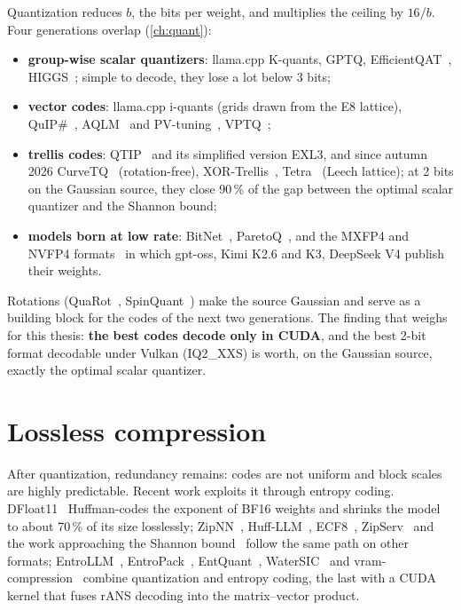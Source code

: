 Quantization reduces $b$, the bits per weight, and multiplies the ceiling by $16/b$. Four generations overlap (\cref{ch:quant}):
\begin{itemize}
\item \textbf{group-wise scalar quantizers}: llama.cpp K-quants, GPTQ, EfficientQAT~\cite{efficientqat2024}, HIGGS~\cite{higgs2024}; simple to decode, they lose a lot below 3 bits;
\item \textbf{vector codes}: llama.cpp i-quants (grids drawn from the E8 lattice), QuIP\#~\cite{quipsharp2024}, AQLM~\cite{aqlm2024} and PV-tuning~\cite{pvtuning2024}, VPTQ~\cite{vptq2024};
\item \textbf{trellis codes}: QTIP~\cite{qtip2024} and its simplified version EXL3, and since autumn 2026 CurveTQ~\cite{curvetq2026} (rotation-free), XOR-Trellis~\cite{xortrellis2026}, Tetra~\cite{tetra2026} (Leech lattice); at 2 bits on the Gaussian source, they close 90\,\% of the gap between the optimal scalar quantizer and the Shannon bound;
\item \textbf{models born at low rate}: BitNet~\cite{bitnet2024}, ParetoQ~\cite{paretoq2025}, and the MXFP4 and NVFP4 formats~\cite{ocpmx2023,nvfp4pretrain2025} in which gpt-oss, Kimi K2.6 and K3, DeepSeek V4 publish their weights.
\end{itemize}
Rotations (QuaRot~\cite{quarot2024}, SpinQuant~\cite{spinquant2024}) make the source Gaussian and serve as a building block for the codes of the next two generations. The finding that weighs for this thesis: \textbf{the best codes decode only in CUDA}, and the best 2-bit format decodable under Vulkan (IQ2\_XXS) is worth, on the Gaussian source, exactly the optimal scalar quantizer.

\section{Lossless compression}\label{sec:etat-sans-perte}

After quantization, redundancy remains: codes are not uniform and block scales are highly predictable. Recent work exploits it through entropy coding. DFloat11~\cite{zhang2025dfloat11} Huffman-codes the exponent of BF16 weights and shrinks the model to about 70\,\% of its size losslessly; ZipNN~\cite{hershcovitch2024zipnn}, Huff-LLM~\cite{yubeaton2025huffllm}, ECF8~\cite{yang2025ecf8}, ZipServ~\cite{zipserv2026} and the work approaching the Shannon bound~\cite{shannonbound2026} follow the same path on other formats; EntroLLM~\cite{entrollm2025}, EntroPack~\cite{entropack2026}, EntQuant~\cite{putzky2026entquant}, WaterSIC~\cite{lifar2026watersic} and vram-compression~\cite{nuri2026vramcompression} combine quantization and entropy coding, the last with a CUDA kernel that fuses rANS decoding into the matrix--vector product.

